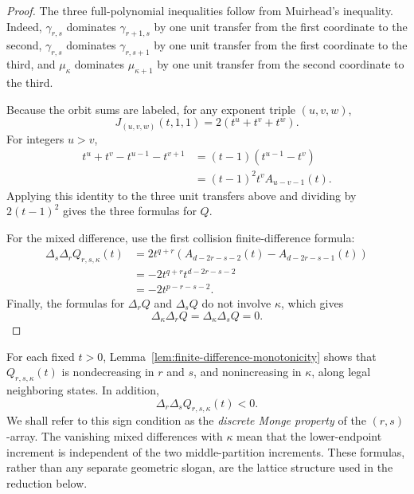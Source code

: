 \documentclass[11pt]{article}
\theoremstyle{definition}
\begin{document}
\begin{proof}
The three full-polynomial inequalities follow from Muirhead's inequality.  Indeed,
\(\gamma_{r,s}\) dominates \(\gamma_{r+1,s}\) by one unit transfer from the first coordinate to the second,
\(\gamma_{r,s}\) dominates \(\gamma_{r,s+1}\) by one unit transfer from the first coordinate to the third, and
\(\mu_\kappa\) dominates \(\mu_{\kappa+1}\) by one unit transfer from the second coordinate to the third.

Because the orbit sums are labeled, for any exponent triple \((u,v,w)\),
\begin{equation*}
J_{(u,v,w)}(t,1,1)
=
2(t^u+t^v+t^w).
\end{equation*}
For integers \(u>v\),
\begin{align*}
t^u+t^v-t^{u-1}-t^{v+1}
&=(t-1)(t^{u-1}-t^v)\\
&=(t-1)^2t^vA_{u-v-1}(t).
\end{align*}
Applying this identity to the three unit transfers above and dividing by
\(2(t-1)^2\) gives the three formulas for \(Q\).

For the mixed difference, use the first collision finite-difference formula:
\begin{align*}
\Delta_s\Delta_rQ_{r,s,\kappa}(t)
&=
2t^{q+r}
\left(
A_{d-2r-s-2}(t)-A_{d-2r-s-1}(t)
\right)\\
&=
-2t^{q+r}t^{d-2r-s-2}\\
&=
-2t^{p-r-s-2}.
\end{align*}
Finally, the formulas for \(\Delta_rQ\) and \(\Delta_sQ\) do not involve \(\kappa\), which gives
\begin{equation*}
\Delta_\kappa\Delta_rQ
=
\Delta_\kappa\Delta_sQ
=0.
\end{equation*}
\end{proof}

For each fixed \(t>0\), Lemma~\ref{lem:finite-difference-monotonicity} shows that
\(Q_{r,s,\kappa}(t)\) is nondecreasing in \(r\) and \(s\), and nonincreasing in \(\kappa\), along legal neighboring states.  In addition,
\begin{equation*}
\Delta_r\Delta_sQ_{r,s,\kappa}(t)<0.
\end{equation*}
We shall refer to this sign condition as the \emph{discrete Monge property} of the \((r,s)\)-array.  The vanishing mixed differences with \(\kappa\) mean that the lower-endpoint increment is independent of the two middle-partition increments.  These formulas, rather than any separate geometric slogan, are the lattice structure used in the reduction below.
\end{document}
